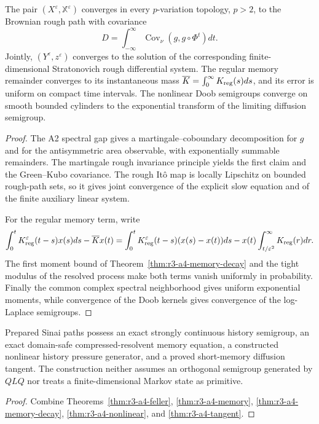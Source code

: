 \begin{theorem}
\label{thm:r3-a4-tangent}
The pair \((X^\varepsilon,\mathbb X^\varepsilon)\) converges in every
\(p\)-variation topology, \(p>2\), to the Brownian rough path with covariance
\[
 D=\int_{-\infty}^{\infty}
 \operatorname{Cov}_\nu(g,g\circ\Phi^t)dt.
\]
Jointly, \((Y^\varepsilon,z^\varepsilon)\) converges to the solution of the
corresponding finite-dimensional Stratonovich rough differential system.  The
regular memory remainder converges to its instantaneous mass
\(\overline K=\int_0^\infty K_{\rm reg}(s)ds\), and its error is uniform on
compact time intervals.  The nonlinear Doob semigroups converge on smooth
bounded cylinders to the exponential transform of the limiting diffusion
semigroup.
\end{theorem}

\begin{proof}
The A2 spectral gap gives a martingale--coboundary decomposition for \(g\) and
for the antisymmetric area observable, with exponentially summable
remainders.  The martingale rough invariance principle yields the first
claim and the Green--Kubo covariance.  The rough It\^o map is locally
Lipschitz on bounded rough-path sets, so it gives joint convergence of the
explicit slow equation and of the finite auxiliary linear system.

For the regular memory term, write
\[
 \int_0^tK_{\rm reg}^\varepsilon(t-s)x(s)ds-
 \overline Kx(t)
 =\int_0^tK_{\rm reg}^\varepsilon(t-s)(x(s)-x(t))ds
 -x(t)\int_{t/\varepsilon^2}^\infty K_{\rm reg}(r)dr.
\]
The first moment bound of Theorem~\ref{thm:r3-a4-memory-decay} and the tight
modulus of the resolved process make both terms vanish uniformly in
probability.  Finally the common complex spectral neighborhood gives uniform
exponential moments, while convergence of the Doob kernels gives convergence
of the log-Laplace semigroups.
\end{proof}

\begin{theorem}
\label{thm:r3-a4-main}
Prepared Sinai paths possess an exact strongly continuous history semigroup,
an exact domain-safe compressed-resolvent memory equation, a constructed
nonlinear history pressure generator, and a proved short-memory diffusion
tangent.  The construction neither assumes an orthogonal semigroup generated
by \(QLQ\) nor treats a finite-dimensional Markov state as primitive.
\end{theorem}

\begin{proof}
Combine Theorems~\ref{thm:r3-a4-feller},
\ref{thm:r3-a4-memory}, \ref{thm:r3-a4-memory-decay},
\ref{thm:r3-a4-nonlinear}, and \ref{thm:r3-a4-tangent}.
\end{proof}
